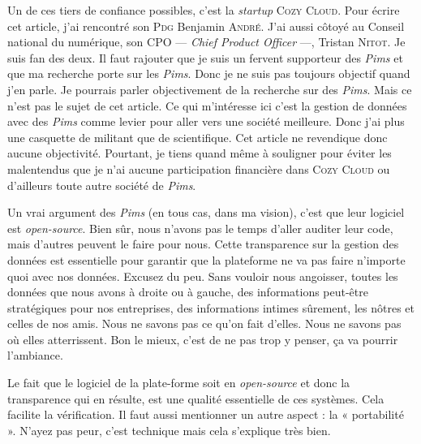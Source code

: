 Un de ces tiers de confiance possibles, c’est la \textit{startup} \textsc{Cozy Cloud}. Pour écrire cet article, j’ai rencontré son \textsc{Pdg} Benjamin \textsc{André}. J’ai aussi côtoyé au Conseil national du numérique, son CPO --- \textit{Chief Product Officer} ---, Tristan \textsc{Nitot}. Je suis fan des deux. Il faut rajouter que je suis un fervent supporteur des \textit{Pims} et que ma recherche porte sur les \textit{Pims}. Donc je ne suis pas toujours objectif quand j’en parle. Je pourrais parler objectivement de la recherche sur des \textit{Pims}. Mais ce n’est pas le sujet de cet article. Ce qui m’intéresse ici c’est la gestion de données avec des \textit{Pims} comme levier pour aller vers une société meilleure. Donc j’ai plus une casquette de militant que de scientifique. Cet article ne revendique donc aucune objectivité. Pourtant, je tiens quand même à souligner pour éviter les malentendus que je n’ai aucune participation financière dans \textsc{Cozy Cloud} ou d’ailleurs toute autre société de \textit{Pims}.

Un vrai argument des \textit{Pims} (en tous cas, dans ma vision), c’est que leur logiciel est \textit{open-source}. Bien sûr, nous n’avons pas le temps d’aller auditer leur code, mais d’autres peuvent le faire pour nous. Cette transparence sur la gestion des données est essentielle pour garantir que la plateforme ne va pas faire n’importe quoi avec nos données. Excusez du peu. Sans vouloir nous angoisser, toutes les données que nous avons à droite ou à gauche, des informations peut-être stratégiques pour nos entreprises, des informations intimes sûrement, les nôtres et celles de nos amis. Nous ne savons pas ce qu’on fait d’elles. Nous ne savons pas où elles atterrissent. Bon le mieux, c’est de ne pas trop y penser, ça va pourrir l’ambiance.

%
Le fait que le logiciel de la plate-forme soit en \textit{open-source} et donc la transparence qui en résulte, est une qualité essentielle de ces systèmes. Cela facilite la vérification. Il faut aussi mentionner un autre aspect : la « portabilité ». N’ayez pas peur, c’est technique mais cela s’explique très bien.

